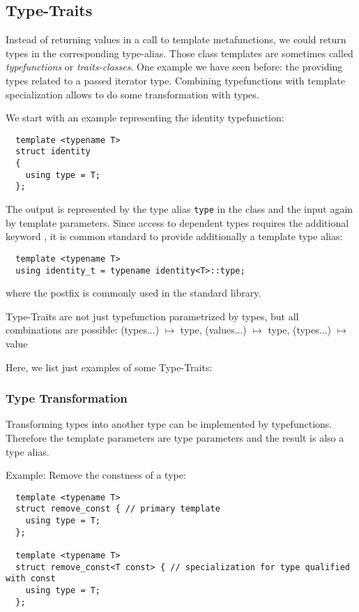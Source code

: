 \subsection{Type-Traits}
Instead of returning values in a call to template metafunctions, we could return types in the corresponding type-alias. Those class templates are
sometimes called \emph{typefunctions} or \emph{traits-classes}. One example we have seen before: the  providing types related
to a passed iterator type. Combining typefunctions with template specialization allows to do some transformation with types.

We start with an example representing the identity typefunction:
%
\begin{verbatim}
  template <typename T>
  struct identity
  {
    using type = T;
  };
\end{verbatim}
%
The output is represented by the type alias \texttt{type} in the class and the input again by template parameters. Since access to dependent types
requires the additional keyword , it is common standard to provide additionally a template type alias:
%
\begin{verbatim}
  template <typename T>
  using identity_t = typename identity<T>::type;
\end{verbatim}
%
where the postfix  is commonly used in the standard library.

Type-Traits are not just typefunction parametrized by types, but all combinations are possible: (types...) $\mapsto$ type, (values...) $\mapsto$ type,
(types...) $\mapsto$ value

Here, we list just examples of some Type-Traits:


\subsubsection{Type Transformation}
Transforming types into another type can be implemented by typefunctions. Therefore the template parameters are type parameters and the result is
also a type alias.

Example: Remove the constness of a type:
\begin{verbatim}
  template <typename T>
  struct remove_const { // primary template
    using type = T;
  };

  template <typename T>
  struct remove_const<T const> { // specialization for type qualified with const
    using type = T;
  };
\end{verbatim}


